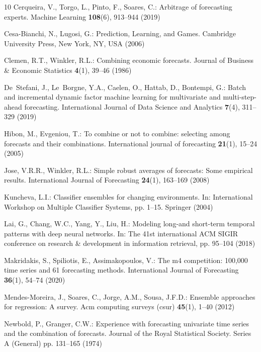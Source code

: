 \documentclass[smallcondensed]{svjour3}
\begin{document}
\begin{thebibliography}{10}
Cerqueira, V., Torgo, L., Pinto, F., Soares, C.: Arbitrage of forecasting
  experts.
\newblock Machine Learning \textbf{108}(6), 913--944 (2019)

Cesa-Bianchi, N., Lugosi, G.: Prediction, Learning, and Games.
\newblock Cambridge University Press, New York, NY, USA (2006)

Clemen, R.T., Winkler, R.L.: Combining economic forecasts.
\newblock Journal of Business \& Economic Statistics \textbf{4}(1), 39--46
  (1986)

De~Stefani, J., Le~Borgne, Y.A., Caelen, O., Hattab, D., Bontempi, G.: Batch
  and incremental dynamic factor machine learning for multivariate and
  multi-step-ahead forecasting.
\newblock International Journal of Data Science and Analytics \textbf{7}(4),
  311--329 (2019)

Hibon, M., Evgeniou, T.: To combine or not to combine: selecting among
  forecasts and their combinations.
\newblock International journal of forecasting \textbf{21}(1), 15--24 (2005)

Jose, V.R.R., Winkler, R.L.: Simple robust averages of forecasts: Some
  empirical results.
\newblock International Journal of Forecasting \textbf{24}(1), 163--169 (2008)

Kuncheva, L.I.: Classifier ensembles for changing environments.
\newblock In: International Workshop on Multiple Classifier Systems, pp. 1--15.
  Springer (2004)

Lai, G., Chang, W.C., Yang, Y., Liu, H.: Modeling long-and short-term temporal
  patterns with deep neural networks.
\newblock In: The 41st international ACM SIGIR conference on research \&
  development in information retrieval, pp. 95--104 (2018)

Makridakis, S., Spiliotis, E., Assimakopoulos, V.: The m4 competition: 100,000
  time series and 61 forecasting methods.
\newblock International Journal of Forecasting \textbf{36}(1), 54--74 (2020)

Mendes-Moreira, J., Soares, C., Jorge, A.M., Sousa, J.F.D.: Ensemble approaches
  for regression: A survey.
\newblock Acm computing surveys (csur) \textbf{45}(1), 1--40 (2012)

Newbold, P., Granger, C.W.: Experience with forecasting univariate time series
  and the combination of forecasts.
\newblock Journal of the Royal Statistical Society. Series A (General) pp.
  131--165 (1974)


\end{thebibliography}
\end{document}
